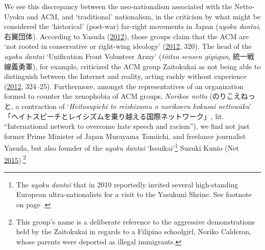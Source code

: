 \documentclass[10pt,british,A4paper,oneside]{memoir}
\makeatletter
\newcommand\footnoteref[1]{\protected@xdef\@thefnmark{\ref{#1}}\@footnotemark}
\makeatother
\begin{document}
We see this discrepancy between the neo-nationalism associated with the
Netto-Uyoku and ACM, and `traditional' nationalism, in the criticism by
what might be considered the `historical' (post-war) far-right movements
in Japan (\emph{uyoku dantai}, 右翼団体). According to Yasuda
(\protect\hyperlink{ref-yasuda_eng:_2012}{2012}), those groups claim
that the ACM are `not rooted in conservative or right-wing ideology'
(\protect\hyperlink{ref-yasuda_eng:_2012}{2012}, 320). The head of the
\emph{uyoku dantai} `Unification Front Volunteer Army' (\emph{tōitsu
sensen giyūgun}, 統一戦線義勇軍), for example, criticized the ACM group
Zaitokukai as not being able to distinguish between the Internet and
reality, acting rashly without experience
(\protect\hyperlink{ref-yasuda_eng:_2012}{2012}, 324--25). Furthermore,
amongst the representatives of an organization formed to counter the
xenophobia of ACM groups, \emph{Norikoe netto} (のりこえねっと, a
contraction of `\emph{Heitosupīchi to reishizumu o norikoeru kokusai
nettowāku}' 「ヘイトスピーチとレイシズムを乗り越える国際ネットワーク」,
lit. ``International network to overcome hate speech and racism''), we
find not just former Prime Minister of Japan Murayama Tomiichi, and
freelance journalist Yasuda, but also founder of the \emph{uyoku dantai}
`Issuikai'\footnote{The \emph{uyoku dantai} that in 2010 reportedly
  invited several high-standing European ultra-nationalists for a visit
  to the Yasukuni Shrine. See footnote \footnoteref{issuikai} on page
  \pageref{issuikai}.} Suzuki Kunio (Net
\protect\hyperlink{ref-net_norikoe_2015}{2015}).\footnote{This group's
  name is a deliberate reference to the aggressive demonstrations held
  by the Zaitokukai in regards to a Filipino schoolgirl, Noriko
  Calderon, whose parents were deported as illegal immigrants.}
\end{document}
